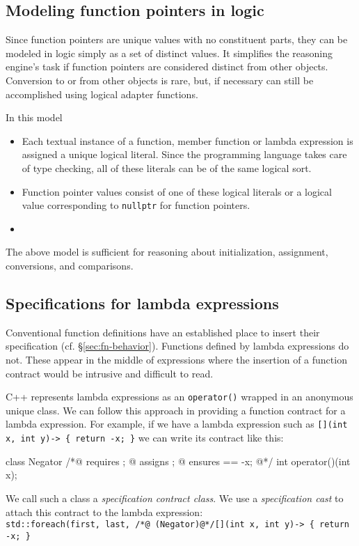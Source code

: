 \subsection{Modeling function pointers in logic}
\label{sec:modelingfp}
 
 Since function pointers are unique values with no constituent parts, they can be modeled in logic simply as a set of distinct values. It simplifies the reasoning engine's task if
 function pointers are considered distinct from other objects.
 Conversion to or from other objects is rare, but, if necessary can still be accomplished using logical adapter functions.
 
 In this model
 \begin{itemize}
 	\item Each textual instance of a function, member function or lambda expression is assigned a unique logical literal.
 	Since the programming language takes care of type checking,
 	all of these literals can be of the same logical sort.
 	\item Function pointer values consist of one of these logical literals or a logical value corresponding to 
 	\lstinline|nullptr| for function pointers.
 	\item {}
 \end{itemize}
The above model is sufficient for reasoning about initialization, assignment, conversions, and comparisons.

\subsection{Specifications for lambda expressions}
\label{sec:lambdaspecs}

Conventional function definitions have an established place to insert their specification (cf. \S\ref{sec:fn-behavior}). Functions defined by lambda expressions do not. These appear in the middle of expressions where the insertion of a function contract would be intrusive and difficult to read.

C++ represents lambda expressions as an \lstinline|operator()| wrapped in an anonymous unique class. We can follow this 
approach in providing a function contract for a lambda expression.  
For example, if we have a lambda expression such as \lstinline|[](int x, int y)-> { return -x; }| we can write its contract like this:
\begin{listing-nonumber}
	class Negator {
		/*@ requires \true;
		  @ assigns \nothing;
		  @ ensures \result == -x;
		  @*/
		int operator()(int x);
	}
\end{listing-nonumber}
We call such a class a \emph{specification contract class}.
We use a \emph{specification cast} to attach this contract to
the lambda expression:\\
\lstinline|std::foreach(first, last, /*@ (Negator)@*/[](int x, int y)-> { return -x; }|

